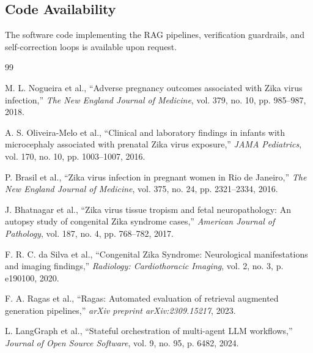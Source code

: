 \documentclass[pdflatex,sn-mathphys-num]{sn-jnl}%
\theoremstyle{thmstyleone}%
\theoremstyle{thmstyletwo}%
\theoremstyle{thmstylethree}%
\begin{document}
\subsection*{Code Availability}
The software code implementing the RAG pipelines, verification guardrails, and self-correction loops is available upon request.

\begin{thebibliography}{99}

M. L. Nogueira et al., ``Adverse pregnancy outcomes associated with Zika virus infection,'' \textit{The New England Journal of Medicine}, vol. 379, no. 10, pp. 985--987, 2018.

A. S. Oliveira-Melo et al., ``Clinical and laboratory findings in infants with microcephaly associated with prenatal Zika virus exposure,'' \textit{JAMA Pediatrics}, vol. 170, no. 10, pp. 1003--1007, 2016.

P. Brasil et al., ``Zika virus infection in pregnant women in Rio de Janeiro,'' \textit{The New England Journal of Medicine}, vol. 375, no. 24, pp. 2321--2334, 2016.

J. Bhatnagar et al., ``Zika virus tissue tropism and fetal neuropathology: An autopsy study of congenital Zika syndrome cases,'' \textit{American Journal of Pathology}, vol. 187, no. 4, pp. 768--782, 2017.

F. R. C. da Silva et al., ``Congenital Zika Syndrome: Neurological manifestations and imaging findings,'' \textit{Radiology: Cardiothoracic Imaging}, vol. 2, no. 3, p. e190100, 2020.

F. A. Ragas et al., ``Ragas: Automated evaluation of retrieval augmented generation pipelines,'' \textit{arXiv preprint arXiv:2309.15217}, 2023.

L. LangGraph et al., ``Stateful orchestration of multi-agent LLM workflows,'' \textit{Journal of Open Source Software}, vol. 9, no. 95, p. 6482, 2024.

\end{thebibliography}
\end{document}
